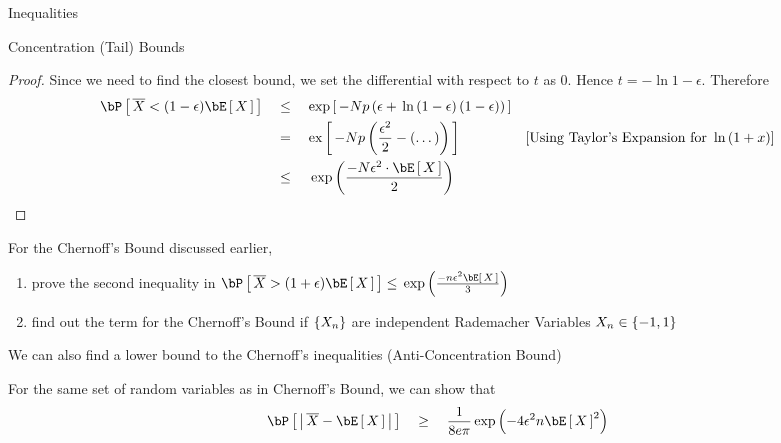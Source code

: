 \documentclass{article}
\begin{document}
\begin{ssection}{Inequalities}
\begin{ssubsection}{Concentration (Tail) Bounds}
\begin{enumerate}[label=\bt{\theenumi.}]
\begin{proof}
					Since we need to find the closest bound, we set the differential with respect to $t$ as 0. Hence $t = - \ln{1 - \epsilon}$. Therefore
					\begin{align*}
						\prob{\compl{X} < (1 - \epsilon) \E{X}}	&\qle	\text{exp}\brac{-Np \para{\epsilon + \ln{1 - \epsilon} (1 - \epsilon)}} \\
																&\eq	\text{ex}\brac{-Np \para{\frac{\epsilon^2}{2} - (\dots)}} \mcmnt{Using Taylor's Expansion for $\ln{1 + x}$} \\
																&\qle	\texp{\frac{-N \epsilon^2 \cdot \E{X}}{2}}
					\end{align*}
                    \endgroup{}
				\end{proof}
		\end{enumerate}

		\begin{exercise}
			For the Chernoff's Bound discussed earlier,
			\begin{enumerate}[label=(\roman*)]
				\item prove the second inequality in  $\prob{\compl{X} > (1 + \epsilon) \E{X}} \le \texp{\frac{-n \epsilon^2 \E{X}}{3}}$
				\item find out the term for the Chernoff's Bound if $\left\{ {X_n} \right\}$ are independent Rademacher Variables \ie $X_n \in \left\{ {-1, 1} \right\}$
			\end{enumerate}
		\end{exercise}

	\end{ssubsection}

	We can also find a lower bound to the Chernoff's inequalities (Anti-Concentration Bound)

	\begin{theorem}
		For the same set of random variables as in Chernoff's Bound, we can show that
		\begin{align*}
			\prob{\abs{\compl{X} - \E{X}}}	\qge	\frac{1}{8e\pi} \texp{-4 \epsilon^2 n \E{X}^2}
		\end{align*}
	\end{theorem}

\end{ssection}
\end{document}
